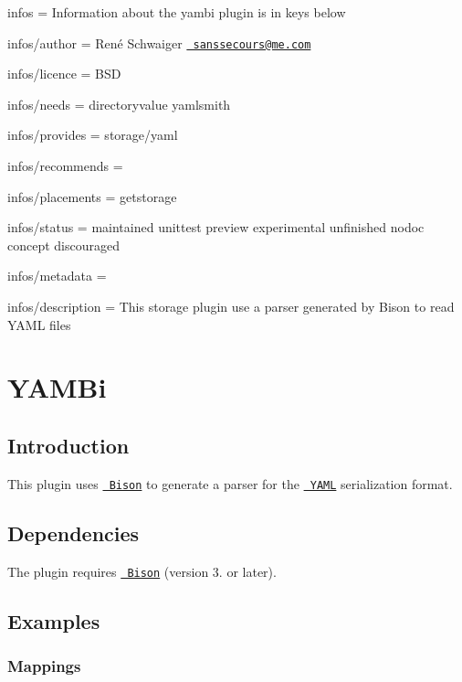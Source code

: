 
\begin{DoxyItemize}
\item infos = Information about the yambi plugin is in keys below
\item infos/author = René Schwaiger \href{mailto:sanssecours@me.com}{\texttt{ sanssecours@me.\+com}}
\item infos/licence = B\+SD
\item infos/needs = directoryvalue yamlsmith
\item infos/provides = storage/yaml
\item infos/recommends =
\item infos/placements = getstorage
\item infos/status = maintained unittest preview experimental unfinished nodoc concept discouraged
\item infos/metadata =
\item infos/description = This storage plugin use a parser generated by Bison to read Y\+A\+ML files
\end{DoxyItemize}\hypertarget{autotoc_md753_src_plugins_yambi_README_md}{}\section{Y\+A\+M\+Bi}\label{autotoc_md753_src_plugins_yambi_README_md}
\hypertarget{autotoc_md753_autotoc_md754}{}\subsection{Introduction}\label{autotoc_md753_autotoc_md754}
This plugin uses \href{https://www.gnu.org/software/bison}{\texttt{ Bison}} to generate a parser for the \href{http://yaml.org}{\texttt{ Y\+A\+ML}} serialization format.\hypertarget{autotoc_md753_autotoc_md755}{}\subsection{Dependencies}\label{autotoc_md753_autotoc_md755}
The plugin requires \href{https://repology.org/metapackage/bison/versions}{\texttt{ Bison}} (version 3. or later).\hypertarget{autotoc_md753_autotoc_md756}{}\subsection{Examples}\label{autotoc_md753_autotoc_md756}
\hypertarget{autotoc_md753_autotoc_md757}{}\subsubsection{Mappings}\label{autotoc_md753_autotoc_md757}

